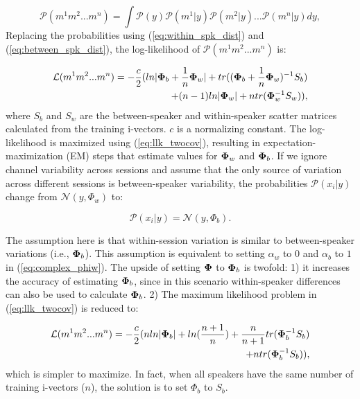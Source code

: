 \begin{equation}
\mathcal{P}(m^1 m^2 ... m^n) = \int \mathcal{P}(y) \mathcal{P}(m^1 | y) \mathcal{P}(m^2 | y) ... \mathcal{P}(m^n | y) dy,
\end{equation}
Replacing the probabilities using (\ref{eq:within_spk_dist}) and (\ref{eq:between_spk_dist}), the log-likelihood of $\mathcal{P}(m^1 m^2 ... m^n)$ is: 


\begin{equation}
\label{eq:llk_twocov}
\begin{split}
\mathcal{L}(m^1 m^2 ... m^n) = -\frac{c}{2}(ln | {\bf \Phi}_b + \frac{1}{n}{\bf \Phi}_w | + tr(({\bf \Phi}_b + \frac{1}{n}{\bf \Phi}_w)^{-1}S_b) \\+ (n-1)ln|{\bf \Phi}_w| + ntr({\bf \Phi}_w^{-1}S_w)),
\end{split}
\end{equation}
where $S_b$ and $S_w$ are the between-speaker and within-speaker scatter matrices calculated from the training i-vectors. $c$ is a normalizing constant. 
The log-likelihood is maximized using (\ref{eq:llk_twocov}), resulting in expectation-maximization (EM) steps that estimate values for ${\bf \Phi}_w$ and ${\bf \Phi}_b$. 
If we ignore channel variability across sessions and assume that the only source of variation across different sessions is between-speaker variability, the probabilities $\mathcal{P} (x_i | y)$ change from $\mathcal{N} (y,\Phi_w)$ to: 

\begin{equation}
\mathcal{P} (x_i|y) = \mathcal{N} (y,\Phi_b).
\end{equation}

The assumption here is that within-session variation is similar to between-speaker variations (i.e., ${\bf \Phi}_b$). 
This assumption is equivalent to setting $\alpha_w$ to $0$ and $\alpha_b$ to $1$ in (\ref{eq:complex_phiw}). 
The upside of setting ${\bf \Phi}$ to ${\bf \Phi}_b$ is twofold: 1) it increases the accuracy of estimating ${\bf \Phi}_b$, since in this scenario within-speaker differences can also be used to calculate ${\bf \Phi}_b$. 2) The maximum likelihood problem in (\ref{eq:llk_twocov}) is reduced to:

\begin{equation}
\label{eq:llk_onecov}
\begin{split}
\mathcal{L}(m^1 m^2 ... m^n) = -\frac{c}{2}(nln | {\bf \Phi}_b | + ln(\frac{n+1}{n})+ \frac{n}{n+1}tr({\bf \Phi}_b^{-1}S_b) \\+ ntr({\bf \Phi}_b^{-1}S_b)),
\end{split}
\end{equation}
which is simpler to maximize. In fact, when all speakers have the same number of training i-vectors ($n$), the solution is to set $\Phi_b$ to $S_b$. 




